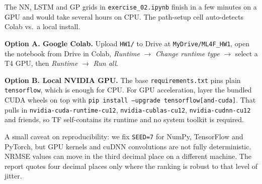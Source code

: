 \documentclass[11pt,a4paper]{article}
\newcommand{\code}[1]{\texttt{#1}}
\begin{document}
\begin{tcolorbox}[colback=NavyBlue!4,colframe=NavyBlue!70!black,
                  title=\textbf{Note: running Exercise 2 (the GPU step)},
                  fonttitle=\bfseries,boxrule=0.6pt,arc=2pt,
                  left=6pt,right=6pt,top=4pt,bottom=4pt]

The NN, LSTM and GP grids in \code{exercise\_02.ipynb} finish in a few
minutes on a GPU and would take several hours on CPU. The path-setup
cell auto-detects Colab vs.\ a local install.

\textbf{Option A. Google Colab.} Upload \code{HW1/} to Drive at
\code{MyDrive/ML4F\_HW1}, open the notebook from Drive in Colab,
\emph{Runtime} $\rightarrow$ \emph{Change runtime type} $\rightarrow$
select a T4 GPU, then \emph{Runtime} $\rightarrow$ \emph{Run all}.

\vspace{12pt}

\textbf{Option B. Local NVIDIA GPU.} The base \code{requirements.txt}
pins plain \code{tensorflow}, which is enough for CPU. For GPU
acceleration, layer the bundled CUDA wheels on top with
\code{pip install --upgrade tensorflow[and-cuda]}. That pulls in
\code{nvidia-cuda-runtime-cu12}, \code{nvidia-cublas-cu12},
\code{nvidia-cudnn-cu12} and friends, so TF self-contains its runtime
and no system toolkit is required.

\end{tcolorbox}

A small caveat on reproducibility: we fix \code{SEED=7} for NumPy,
TensorFlow and PyTorch, but GPU kernels and cuDNN convolutions are not
fully deterministic. NRMSE values can move in the third decimal place on
a different machine. The report quotes four decimal places only where the
ranking is robust to that level of jitter.
\end{document}
